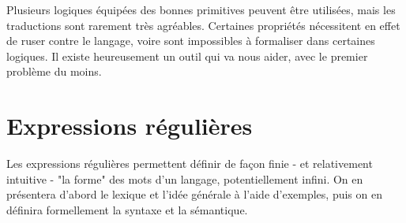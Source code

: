 Plusieurs logiques équipées des bonnes primitives peuvent être utilisées, mais les traductions sont rarement très agréables. Certaines propriétés nécessitent en effet de ruser contre le langage, voire sont impossibles à formaliser dans certaines logiques. Il existe heureusement un outil qui va nous aider, avec le premier problème du moins.

\chapter{Expressions régulières}
\label{regex}
Les expressions régulières permettent définir de façon finie - et relativement intuitive - "la forme" des mots d'un langage, potentiellement infini. On en présentera d'abord le lexique et l'idée générale à l'aide d'exemples, puis on en définira formellement la syntaxe et la sémantique.
